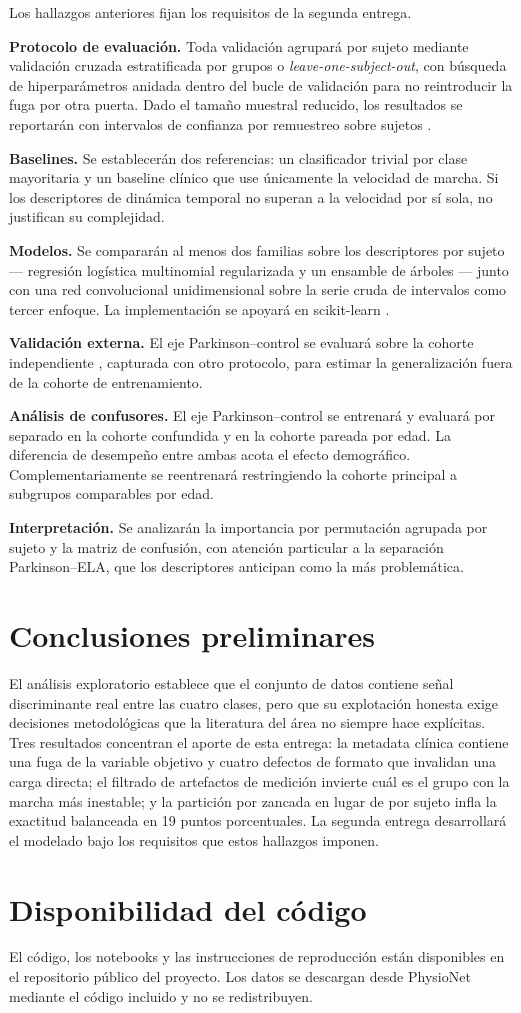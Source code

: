 \documentclass[conference]{IEEEtran}
\begin{document}
Los hallazgos anteriores fijan los requisitos de la segunda entrega.

\textbf{Protocolo de evaluación.} Toda validación agrupará por sujeto mediante validación cruzada estratificada por grupos o \textit{leave-one-subject-out}, con búsqueda de hiperparámetros anidada dentro del bucle de validación para no reintroducir la fuga por otra puerta. Dado el tamaño muestral reducido, los resultados se reportarán con intervalos de confianza por remuestreo sobre sujetos \cite{varoquaux2018}.

\textbf{Baselines.} Se establecerán dos referencias: un clasificador trivial por clase mayoritaria y un baseline clínico que use únicamente la velocidad de marcha. Si los descriptores de dinámica temporal no superan a la velocidad por sí sola, no justifican su complejidad.

\textbf{Modelos.} Se compararán al menos dos familias sobre los descriptores por sujeto --- regresión logística multinomial regularizada y un ensamble de árboles --- junto con una red convolucional unidimensional sobre la serie cruda de intervalos como tercer enfoque. La implementación se apoyará en scikit-learn \cite{pedregosa2011}.

\textbf{Validación externa.} El eje Parkinson--control se evaluará sobre la cohorte independiente \cite{frenkel2005}, capturada con otro protocolo, para estimar la generalización fuera de la cohorte de entrenamiento.

\textbf{Análisis de confusores.} El eje Parkinson--control se entrenará y evaluará por separado en la cohorte confundida y en la cohorte pareada por edad. La diferencia de desempeño entre ambas acota el efecto demográfico. Complementariamente se reentrenará restringiendo la cohorte principal a subgrupos comparables por edad.

\textbf{Interpretación.} Se analizarán la importancia por permutación agrupada por sujeto y la matriz de confusión, con atención particular a la separación Parkinson--ELA, que los descriptores anticipan como la más problemática.

\section{Conclusiones preliminares}

El análisis exploratorio establece que el conjunto de datos contiene señal discriminante real entre las cuatro clases, pero que su explotación honesta exige decisiones metodológicas que la literatura del área no siempre hace explícitas. Tres resultados concentran el aporte de esta entrega: la metadata clínica contiene una fuga de la variable objetivo y cuatro defectos de formato que invalidan una carga directa; el filtrado de artefactos de medición invierte cuál es el grupo con la marcha más inestable; y la partición por zancada en lugar de por sujeto infla la exactitud balanceada en 19 puntos porcentuales. La segunda entrega desarrollará el modelado bajo los requisitos que estos hallazgos imponen.

\section*{Disponibilidad del código}

El código, los notebooks y las instrucciones de reproducción están disponibles en el repositorio público del proyecto. Los datos se descargan desde PhysioNet mediante el código incluido y no se redistribuyen.



\end{document}
